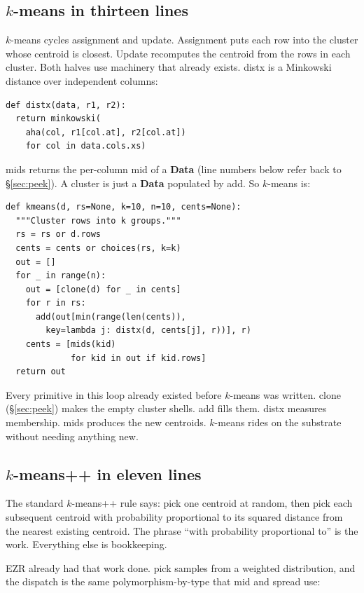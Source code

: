 \documentclass[AMA,STIX2COL]{WileyNJDv5}
\newcommand{\IT}{{\sffamily EZR}}
\newcommand{\cls}[1]{%
  \setlength{\fboxsep}{1.5pt}%
  \colorbox{clsbg}{\sffamily\bfseries{#1}}%
}
\begin{document}
\subsection{$k$-means in thirteen lines}

$k$-means cycles assignment and update. Assignment puts each
row into the cluster whose centroid is closest. Update recomputes
the centroid from the rows in each cluster. Both halves use
machinery that already exists. \textsf{distx} is a Minkowski
distance over independent columns:

\begin{verbatim}
def distx(data, r1, r2):
  return minkowski(
    aha(col, r1[col.at], r2[col.at])
    for col in data.cols.xs)
\end{verbatim}

\textsf{mids} returns the per-column \textsf{mid} of a
\cls{Data} (line numbers below refer back to \S\ref{sec:peek}).
A cluster is just a \cls{Data} populated by \textsf{add}. So
$k$-means is:

\begin{verbatim}
def kmeans(d, rs=None, k=10, n=10, cents=None):
  """Cluster rows into k groups."""
  rs = rs or d.rows
  cents = cents or choices(rs, k=k)
  out = []
  for _ in range(n):
    out = [clone(d) for _ in cents]
    for r in rs:
      add(out[min(range(len(cents)),
        key=lambda j: distx(d, cents[j], r))], r)
    cents = [mids(kid)
             for kid in out if kid.rows]
  return out
\end{verbatim}

Every primitive in this loop already existed before $k$-means
was written. \textsf{clone} (\S\ref{sec:peek}) makes the empty
cluster shells. \textsf{add} fills them. \textsf{distx}
measures membership. \textsf{mids} produces the new centroids.
$k$-means rides on the substrate without needing anything new.

\subsection{$k$-means++ in eleven lines}

The standard $k$-means++ rule says: pick one centroid at
random, then pick each subsequent centroid with probability
proportional to its squared distance from the nearest existing
centroid. The phrase ``with probability proportional to'' is
the work. Everything else is bookkeeping.

\IT{} already had that work done. \textsf{pick} samples from a
weighted distribution, and the dispatch is the same
polymorphism-by-type that \textsf{mid} and \textsf{spread} use:
\end{document}
